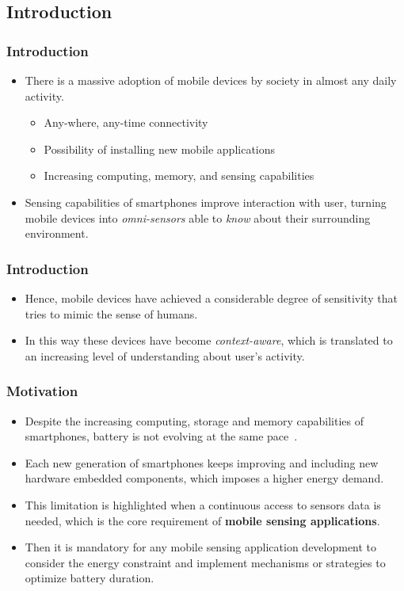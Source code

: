 \documentclass[compress,9pt,xcolor={dvipsnames,table}]{beamer}
\begin{document}
\subsection{Introduction}
\begin{frame}\frametitle{Introduction}
\begin{itemize}
	\item There is a massive adoption of mobile devices by society in almost any daily activity.
	\begin{itemize}
		\item Any-where, any-time connectivity
		\item Possibility of installing new mobile applications
		\item Increasing computing, memory, and sensing capabilities
	\end{itemize}
	\item Sensing capabilities of smartphones improve interaction with user, turning mobile devices into \emph{omni-sensors} able to \emph{know} about their surrounding environment.
\end{itemize}
\end{frame}

\begin{frame}\frametitle{Introduction}
\begin{itemize}
	\item Hence, mobile devices have achieved a considerable degree of sensitivity that tries to mimic the sense of humans.
	\item In this way these devices have become \emph{context-aware}, which is translated to an increasing level of understanding about user's activity.
\end{itemize}
\end{frame}


\begin{frame}\frametitle{Motivation}
\begin{itemize}
	\item Despite the increasing computing, storage and memory capabilities of smartphones, battery is not evolving at the same pace~\cite{Kjaergaard2012}.
	\item Each new generation of smartphones keeps improving and including new hardware embedded components, which imposes a higher energy demand.
	\item This limitation is highlighted when a continuous access to sensors data is needed, which is the core requirement of \textbf{mobile sensing applications}.
	\item Then it is mandatory for any mobile sensing application development to consider the energy constraint and implement mechanisms or strategies to optimize battery duration.

\end{itemize}
\end{frame}
\end{document}
